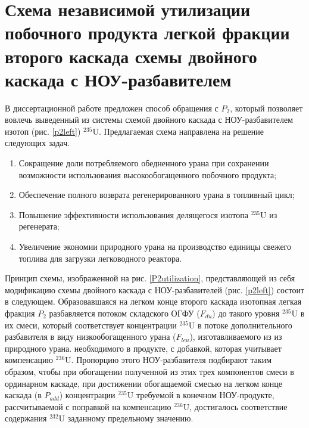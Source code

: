 

\section{Схема независимой утилизации побочного продукта легкой фракции второго каскада схемы двойного каскада с НОУ-разбавителем}

В диссертационной работе предложен способ обращения с $P_2$, который позволяет вовлечь выведенный из системы схемой двойного каскада с НОУ-разбавителем изотоп (рис. \ref{p2left}) $^{235}$U. Предлагаемая схема направлена на решение следующих задач.

\begin{enumerate}
  \item Сокращение доли потребляемого обедненного урана при сохранении возможности использования высокообогащенного побочного продукта;
  \item Обеспечение полного возврата регенерированного урана в топливный цикл;
  \item Повышение эффективности использования делящегося изотопа $^{235}$U из регенерата;
  \item Увеличение экономии природного урана на производство единицы свежего топлива для загрузки легководного реактора.
\end{enumerate}

Принцип схемы, изображенной на рис. \ref{P2utilization}, представляющей из себя модификацию схемы двойного каскада с НОУ-разбавителей (рис. \ref{p2left}) состоит в следующем.
Образовавшаяся на легком конце второго каскада изотопная легкая фракция $P_2$  разбавляется потоком складского ОГФУ ($F_{du}$) до такого уровня $^{235}$U в их смеси, который соответствует концентрации $^{235}$U в потоке дополнительного разбавителя в виду низкообогащенного урана ($F_{leu}$), изготавливаемого из из природного урана. необходимого в продукте, с добавкой, которая учитывает компенсацию $^{236}$U. Пропорцию этого НОУ-разбавителя подбирают таким образом, чтобы при обогащении полученной из этих трех компонентов смеси в ординарном каскаде, при достижении обогащаемой смесью на легком конце каскада (в  $P_{add}$) концентрации $^{235}$U требуемой в конечном НОУ-продукте, рассчитываемой с поправкой на компенсацию $^{236}$U, достигалось соответствие содержания $^{232}$U заданному предельному значению.

